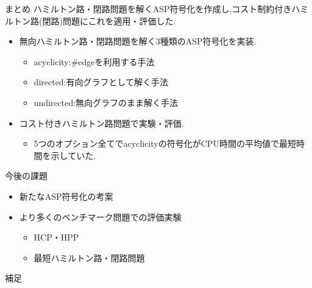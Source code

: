 \documentclass[dvipdfmx,11pt]{beamer}
\begin{document}
\begin{frame}{まとめ}
  ハミルトン路・閉路問題を解くASP符号化を作成し,コスト制約付きハミルトン路(閉路)問題にこれを適用・評価した.
  \begin{itemize}
  \item 無向ハミルトン路・閉路問題を解く3種類のASP符号化を実装.
    \begin{itemize}
    \item acyclicity:\#edgeを利用する手法
    \item directed:有向グラフとして解く手法
    \item undirected:無向グラフのまま解く手法
    \end{itemize}
  \item コスト付きハミルトン路問題で実験・評価.
    \begin{itemize}
    \item 5つのオプション全てでacyclicityの符号化がCPU時間の平均値で最短時間を示していた.
    \end{itemize}
  \end{itemize}
  \begin{alertblock}{今後の課題}
    \begin{itemize}
    \item 新たなASP符号化の考案
    \item より多くのベンチマーク問題での評価実験
      \begin{itemize}
      \item HCP・HPP
      \item 最短ハミルトン路・閉路問題
      \end{itemize}
    \end{itemize}
  \end{alertblock}
\end{frame}
\begin{frame}{}
  補足
\end{frame}
\end{document}
